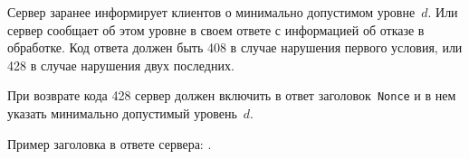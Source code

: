 Сервер заранее информирует клиентов о минимально допустимом уровне~$d$.
Или сервер сообщает об этом уровне в своем ответе с информацией об отказе 
в обработке. Код ответа должен быть 408 в случае нарушения первого 
условия, или 428 в случае нарушения двух последних.

При возврате кода 428 сервер должен включить в ответ 
заголовок~\texttt{Nonce} и в нем указать минимально допустимый 
уровень~$d$.

Пример заголовка в ответе сервера: .

